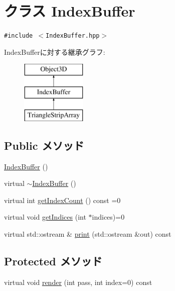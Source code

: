 \hypertarget{classm3g_1_1IndexBuffer}{
\section{クラス IndexBuffer}
\label{classm3g_1_1IndexBuffer}
}
{\tt \#include $<$IndexBuffer.hpp$>$}

IndexBufferに対する継承グラフ:\begin{figure}[H]
\begin{center}
\leavevmode
\includegraphics[height=3cm]{classm3g_1_1IndexBuffer}
\end{center}
\end{figure}
\subsection*{Public メソッド}
\begin{CompactItemize}
\item 
\hyperlink{classm3g_1_1IndexBuffer_d2e68a2d7c6c753d3abfeef42ee79427}{IndexBuffer} ()
\item 
virtual \hyperlink{classm3g_1_1IndexBuffer_ac7952364fe4d2d7b2731da5380c841c}{$\sim$IndexBuffer} ()
\item 
virtual int \hyperlink{classm3g_1_1IndexBuffer_ac7d2c37f177b21195a81f00061ef94e}{getIndexCount} () const =0
\item 
virtual void \hyperlink{classm3g_1_1IndexBuffer_59fb1eca8810ea3b028735c5dce53fca}{getIndices} (int $\ast$indices)=0
\item 
virtual std::ostream \& \hyperlink{classm3g_1_1IndexBuffer_6fea17fa1532df3794f8cb39cb4f911f}{print} (std::ostream \&out) const 
\end{CompactItemize}
\subsection*{Protected メソッド}
\begin{CompactItemize}
\item 
virtual void \hyperlink{classm3g_1_1IndexBuffer_1efcb1973989d9963d5bd6d03065d389}{render} (int pass, int index=0) const 
\end{CompactItemize}
